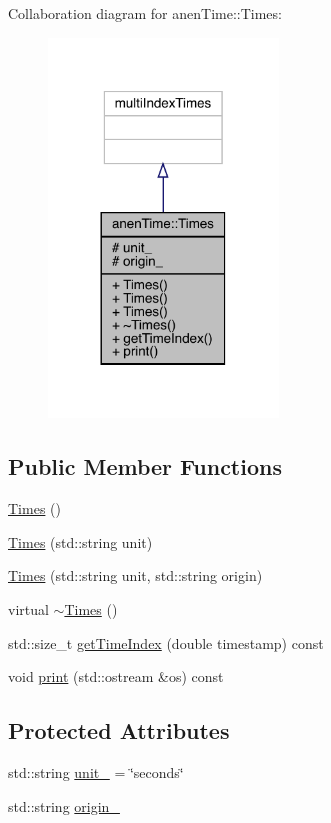 Collaboration diagram for anen\+Time\+:\+:Times\+:\nopagebreak
\begin{figure}[H]
\begin{center}
\leavevmode
\includegraphics[width=173pt]{classanen_time_1_1_times__coll__graph}
\end{center}
\end{figure}
\subsection*{Public Member Functions}
\begin{DoxyCompactItemize}
\item 
\mbox{\hyperlink{classanen_time_1_1_times_a66161eb232f580fe090579b8e19e3618}{Times}} ()
\item 
\mbox{\hyperlink{classanen_time_1_1_times_a2bd2c89fd910120a72eab80017792125}{Times}} (std\+::string unit)
\item 
\mbox{\hyperlink{classanen_time_1_1_times_a73794184536377320073427409a63da6}{Times}} (std\+::string unit, std\+::string origin)
\item 
virtual \mbox{\hyperlink{classanen_time_1_1_times_abd871e7729adf2622a3e5ed41945aa3c}{$\sim$\+Times}} ()
\item 
std\+::size\+\_\+t \mbox{\hyperlink{classanen_time_1_1_times_a9df2a7b0c4211d262853b8facc3f4163}{get\+Time\+Index}} (double timestamp) const
\item 
void \mbox{\hyperlink{classanen_time_1_1_times_aec5c8186b68d51239dbee83a7303e5d0}{print}} (std\+::ostream \&os) const
\end{DoxyCompactItemize}
\subsection*{Protected Attributes}
\begin{DoxyCompactItemize}
\item 
std\+::string \mbox{\hyperlink{classanen_time_1_1_times_a1bc1f74d961af9efa6462b2cbe5f3718}{unit\+\_\+}} = \char`\"{}seconds\char`\"{}
\item 
std\+::string \mbox{\hyperlink{classanen_time_1_1_times_a7e08602fb0628df1c5f1cccbb98baeb1}{origin\+\_\+}}
\end{DoxyCompactItemize}
